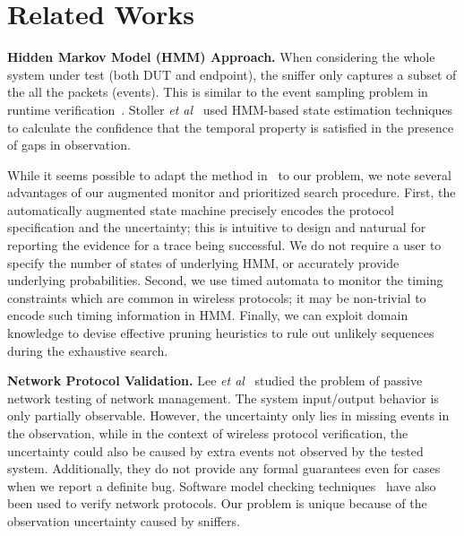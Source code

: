 \section{Related Works}
\label{sec:related}

\textbf{Hidden Markov Model (HMM) Approach.} When considering the whole system
under test (both DUT and endpoint), the sniffer only captures a subset of the
all the packets (events).  This is similar to the event sampling problem in
runtime
verification~\cite{bonakdarpour2011sampling,hauswirth2004low,arnold2008qvm,fei2006artemis,basin2012monitoring}.
Stoller \textit{et al}~\cite{stoller2011runtime} used HMM-based state estimation
techniques to calculate the confidence that the temporal property is satisfied
in the presence of gaps in observation.

While it seems possible to adapt the
method in~\cite{stoller2011runtime} to our problem, we note several advantages
of our augmented monitor and prioritized search procedure.  First, the
automatically augmented state machine precisely encodes the protocol
specification and the uncertainty; this is intuitive to design and naturual for
reporting the evidence for a trace being successful.  We do not require a user
to specify the number of states of underlying HMM, or accurately provide
underlying probabilities.  Second, we use timed automata to monitor the timing
constraints which are common in wireless protocols; it may be non-trivial to
encode such timing information in HMM.  Finally, we can exploit domain knowledge
to devise effective pruning heuristics to rule out unlikely sequences during the
exhaustive search. 

\textbf{Network Protocol Validation.} Lee \textit{et al}~\cite{lee1997passive}
studied the problem of passive network testing of network management. The system
input/output behavior is only partially observable. However, the uncertainty
only lies in missing events in the observation, while in the context of wireless
protocol verification, the uncertainty could also be caused by extra events not
observed by the tested system. Additionally, they do not provide any formal
guarantees even for cases when we report a definite bug.  Software model
checking techniques~\cite{musuvathi2002cmc,godefroid1997model} have also been
used to verify network protocols. Our problem is unique because of the
observation uncertainty caused by sniffers.

